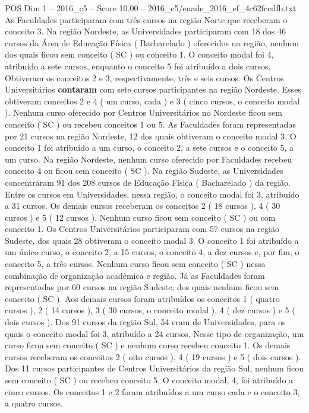 \begin{textsample}{POS Dim 1 – 2016\_c5 – Score 10.00 – 2016\_c5/enade\_2016\_ef\_4c62fccdfb.txt}
As Faculdades participaram com três cursos na região Norte que receberam o conceito 3.
Na região Nordeste, as Universidades participaram com 18 dos 46 cursos da Área de Educação Física ( Bacharelado ) oferecidos na região, nenhum dos quais ficou sem conceito ( SC ) ou conceito 1.
O conceito modal foi 4, atribuído a sete cursos, enquanto o conceito 5 foi atribuído a dois cursos.
Obtiveram os conceitos 2 e 3, respectivamente, três e seis cursos.
Os Centros Universitários \textbf{contaram} com sete cursos participantes na região Nordeste.
Esses obtiveram conceitos 2 e 4 ( um curso, cada ) e 3 ( cinco cursos, o conceito modal ).
Nenhum curso oferecido por Centros Universitários no Nordeste ficou sem conceito ( SC ) ou recebeu conceitos 1 ou 5.
As Faculdades foram representadas por 21 cursos na região Nordeste, 12 dos quais obtiveram o conceito modal 3.
O conceito 1 foi atribuído a um curso, o conceito 2, a sete cursos e o conceito 5, a um curso.
Na região Nordeste, nenhum curso oferecido por Faculdades recebeu conceito 4 ou ficou sem conceito ( SC ).
Na região Sudeste, as Universidades concentraram 91 dos 208 cursos de Educação Física ( Bacharelado ) da região.
Entre os cursos em Universidades, nessa região, o conceito modal foi 3, atribuído a 31 cursos.
Os demais cursos receberam os conceitos 2 ( 18 cursos ), 4 ( 30 cursos ) e 5 ( 12 cursos ).
Nenhum curso ficou sem conceito ( SC ) ou com conceito 1.
Os Centros Universitários participaram com 57 cursos na região Sudeste, dos quais 28 obtiveram o conceito modal 3.
O conceito 1 foi atribuído a um único curso, o conceito 2, a 15 cursos, o conceito 4, a dez cursos e, por fim, o conceito 5, a três cursos.
Nenhum curso ficou sem conceito ( SC ) nessa combinação de organização acadêmica e região.
Já as Faculdades foram representadas por 60 cursos na região Sudeste, dos quais nenhum ficou sem conceito ( SC ).
Aos demais cursos foram atribuídos os conceitos 1 ( quatro cursos ), 2 ( 14 cursos ), 3 ( 30 cursos, o conceito modal ), 4 ( dez cursos ) e 5 ( dois cursos ).
Dos 91 cursos da região Sul, 54 eram de Universidades, para os quais o conceito modal foi 3, atribuído a 24 cursos.
Nesse tipo de organização, um curso ficou sem conceito ( SC ) e nenhum curso recebeu conceito 1.
Os demais cursos receberam os conceitos 2 ( oito cursos ), 4 ( 19 cursos ) e 5 ( dois cursos ).
Dos 11 cursos participantes de Centros Universitários da região Sul, nenhum ficou sem conceito ( SC ) ou recebeu conceito 5.
O conceito modal, 4, foi atribuído a cinco cursos.
Os conceitos 1 e 2 foram atribuídos a um curso cada e o conceito 3, a quatro cursos.

\end{textsample}
